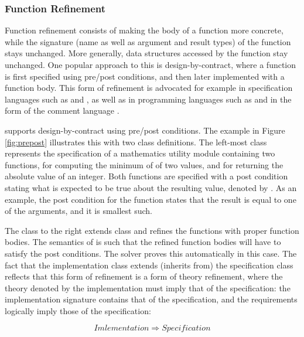 \subsubsection{Function Refinement}

Function refinement consists of making the body of a function more concrete,
while the signature (name as well as  argument and result types) of the 
function stays unchanged. More generally, data 
structures accessed by the function stay unchanged. One popular approach to this
is design-by-contract, where a function is first specified using pre/post 
conditions, and then later implemented with a function body. This form of 
refinement is advocated for example in specification languages such as 
\vdm{} \cite{vdm} and \raiselang{} \cite{raise92,george-raise-2008}, as well as in programming languages such as \eiffel{} \cite{eiffel} and \java{} in the form of the \jml{} comment language \cite{jml}. 

\Klang{} supports design-by-contract using pre/post conditions. The example in
Figure \ref{fig:prepost} illustrates this with two class definitions. The left-most
class  represents the specification of a mathematics utility 
module containing two functions,  for computing the minimum of of
two values, and  for returning the absolute value of an integer. Both 
functions are specified with a post condition stating what is expected to be true
about the resulting value, denoted by . As an example, the post
condition for the  function states that the result is equal to one of
the arguments, and it is smallest such.

The class 
to the right extends class  and refines the functions with
proper function bodies. The semantics of \Klang{} is such that the refined function 
bodies will have to satisfy the post conditions. The \Klang{} solver proves this
automatically in this case. The fact that the implementation class extends 
(inherits from) the specification class reflects that this form of refinement is a 
form of theory refinement, where the theory denoted by the implementation must imply 
that of the specification: the implementation signature contains that of the 
specification, and the requirements logically imply those of the specification:

\[
Imlementation \Rightarrow Specification
\]


